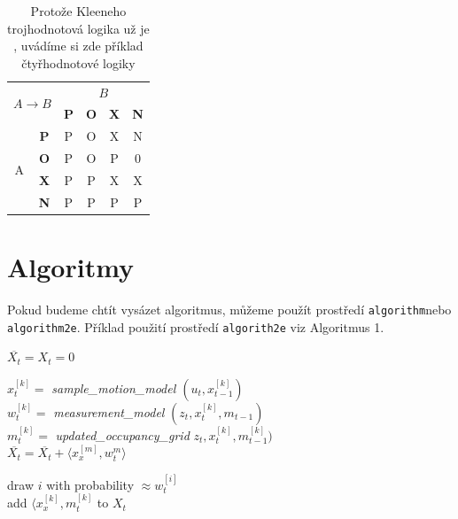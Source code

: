 \documentclass[a4paper, 11pt]{article}
\begin{document}
\begin{table}[ht]
\begin{center}
\begin{tabular}{|c|c|c|c|c|c|}
			\multicolumn{2}{|c|}{\multirow{2}{*}{$A \rightarrow B$}} & \multicolumn{4}{|c|}{$B$} \\
			\cline{3-6}

			\multicolumn{2}{|c|}{} & \textbf{P} & \textbf{O} & \textbf{X} & \textbf{N} \\ 
			\hline
			\multirow{4}{*}{A} & \textbf{P} & P & O & X & N \\ 
			\cline{2-6}
			& \textbf{O} & P & O & P & 0 \\
			\cline{2-6}
			 & \textbf{X} & P & P & X & X \\
			\cline{2-6}
			& \textbf{N} & P & P & P & P \\


			\hline

		\hline
	\end{tabular}
\end{center}
	\caption{Protože Kleeneho trojhodnotová logika už je , uvádíme si zde příklad čtyřhodnotové logiky}
	\label{tabulka2}

\end{table}





\newpage

\section{Algoritmy}
Pokud budeme chtít vysázet algoritmus, můžeme použít prostředí \texttt{algorithm}\footnotemark[2] nebo \texttt{algorithm2e}\footnotemark[3]. Příklad použití prostředí \texttt{algorith2e} viz Algoritmus 1.

\begin{algorithm}[H]
\caption{}



	\BlankLine

	$\overline{X_t} = X_t = 0$\\
	{

		$x_t^{[k]} = $ \emph{sample\_motion\_model $(u_t,x_{t-1}^{[k]})$} \\
		$w_t^{[k]} = $ \emph{measurement\_model} $(z_t,x_t^{[k]},m_{t-1})$ \\
		$m_t^{[k]} = $ \emph{updated\_occupancy\_grid} $z_t,x_t^{[k]},m_{t-1}^{[k]})$ \\
		$\overline{X_t} = \overline{X_t} + \langle x_x^{[m]}, w_t^{m} \rangle$

	}
	{
		\textnormal{draw} $i$ \textnormal{with probability} $\approx w_t^{[i]}$ \\
		\textnormal{add} $\langle x_x^{[k]}, m_t^{[k]}$ \textnormal{to} $X_t$
	}

\label{algoritmus1}
\end{algorithm}
\end{document}
